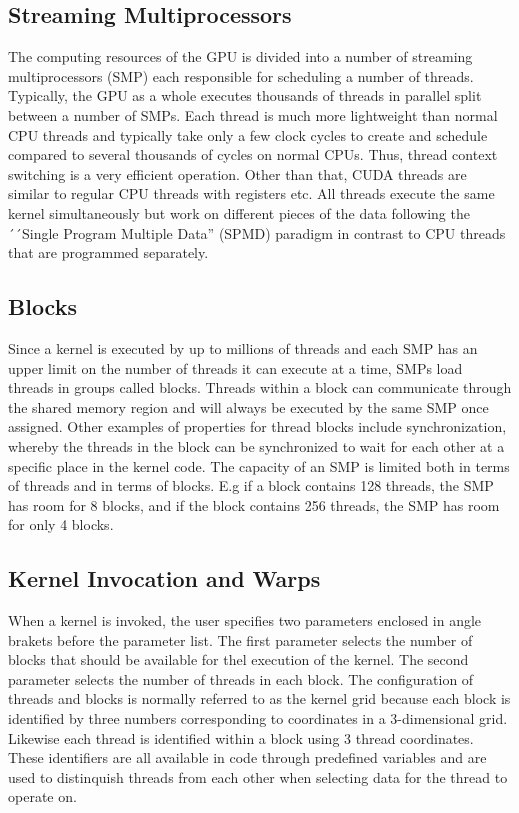 \subsection{Streaming Multiprocessors}
The computing resources of the GPU is divided into a number of streaming multiprocessors (SMP) each responsible for scheduling a number of threads. Typically, the GPU as a whole executes thousands of threads in parallel split between a number of SMPs. Each thread is much more lightweight than normal CPU threads and typically take only a few clock cycles to create and schedule compared to several thousands of cycles on normal CPUs. Thus, thread context switching is a very efficient operation. Other than that, CUDA threads are similar to regular CPU threads with registers etc. All threads execute the same kernel simultaneously but work on different pieces of the data following the ´´Single Program Multiple Data'' (SPMD) paradigm in contrast to CPU threads that are programmed separately. \\

\subsection{Blocks}
Since a kernel is executed by up to millions of threads and each SMP has an upper limit on the number of threads it can execute at a time, SMPs load threads in groups called blocks. Threads within a block can communicate through the shared memory region and will always be executed by the same SMP once assigned. Other examples of properties for thread blocks include synchronization, whereby the threads in the block can be synchronized to wait for each other at a specific place in the kernel code. The capacity of an SMP is limited both in terms of threads and in terms of blocks. E.g if a block contains 128 threads, the SMP has room for 8 blocks, and if the block contains 256 threads, the SMP has room for only 4 blocks.

\subsection{Kernel Invocation and Warps}
\label{sec:kernelandwarps}
When a kernel is invoked, the user specifies two parameters enclosed in angle brakets before the parameter list. The first parameter selects the number of blocks that should be available for thel execution of the kernel. The second parameter selects the number of threads in each block. The configuration of threads and blocks is normally referred to as the kernel grid because each block is identified by three numbers corresponding to coordinates in a 3-dimensional grid. Likewise each thread is identified within a block using 3 thread coordinates. These identifiers are all available in code through predefined variables and are used to distinquish threads from each other when selecting data for the thread to operate on.

